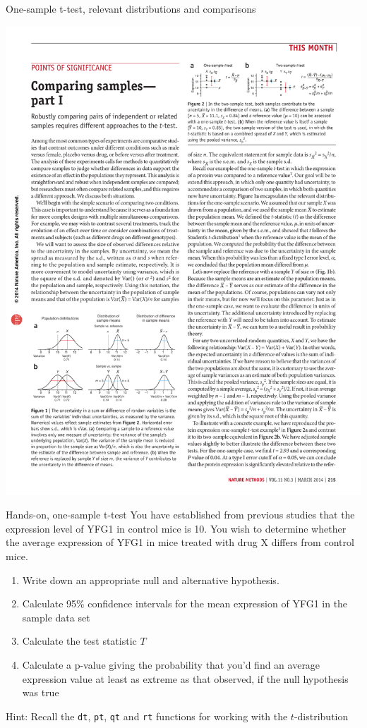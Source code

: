 \documentclass[presentation]{beamer}
\begin{document}
\begin{frame}[label={sec:org1a6936c}]{One-sample t-test, relevant distributions and comparisons}
\begin{center}
\includegraphics[height=0.30\textheight]{fig-onesample-ttest.pdf}
\end{center}


\end{frame}

\begin{frame}[fragile,label={sec:org482fa1e}]{Hands-on, one-sample t-test}
 You have established from previous studies that the expression level of YFG1 in control mice is 10.  You wish to determine whether the average expression of YFG1 in mice treated with drug X differs from control mice.

\begin{enumerate}
\item Write down an appropriate null and alternative hypothesis.
\item Calculate 95\% confidence intervals for the mean expression of YFG1 in the sample data set
\item Calculate the test statistic \(T\)
\item Calculate a p-value giving the probability that you'd find an average expression value at least as extreme as that observed, if the null hypothesis was true
\end{enumerate}

Hint: Recall the \texttt{dt}, \texttt{pt}, \texttt{qt} and \texttt{rt} functions for working with the \(t\)-distribution
\end{frame}
\end{document}
